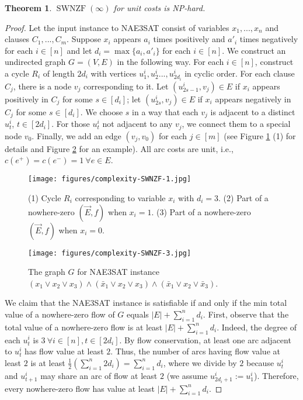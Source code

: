 \documentclass[11pt]{article}
\newtheorem{theorem}{Theorem}
\begin{document}
\begin{theorem}\label{thm:complexity-SWNZF}
    $\operatorname{SWNZF}(\infty)$ for unit costs is NP-hard.
\end{theorem}
\begin{proof}
    Let the input instance to NAE3SAT consist of variables $x_1,...,x_n$ and clauses $C_1,...,C_m$. Suppose $x_i$ appears $a_i$ times positively and $a'_i$ times negatively for each $i\in [n]$ and let $d_i=\max\{a_i,a'_i\}$ for each $i\in [n]$. We construct an undirected graph $G=(V,E)$ in the following way. For each $i\in [n]$, construct a cycle $R_i$ of length $2d_i$ with vertices $u_1^i,u_2^i...,u_{2d_i}^i$ in cyclic order. For each clause $C_j$, there is a node $v_j$ corresponding to it. Let $(u^i_{2s-1},v_j)\in E$ if $x_i$ appears positively in $C_j$ for some $s\in [d_i]$; let $(u^i_{2s},v_j)\in E$ if $x_i$ appears negatively in $C_j$ for some $s\in [d_i]$. We choose $s$ in a way that each $v_j$ is adjacent to a distinct $u^i_t$, $t\in [2d_i]$. For those $u^i_t$ not adjacent to any $v_j$, we connect them to a special node $v_0$. Finally, we add an edge $(v_j,v_0)$ for each $j\in [m]$ (see Figure \ref{fig:complexity-SWNZF-1} (1) for details and Figure \ref{fig:complexity-SWNZF-3} for an example). All arc costs are unit, i.e., $c(e^+)=c(e^-)=1\ \forall e\in E$.
    \begin{figure}[htbp]
        \centering
        \texttt{[image: figures/complexity-SWNZF-1.jpg]}
        \caption{(1) Cycle $R_i$ corresponding to variable $x_i$ with $d_i=3$. (2) Part of a nowhere-zero $(\vec{E},f)$ when $x_i=1$. (3) Part of a nowhere-zero $(\vec{E},f)$ when $x_i=0$.}
        \label{fig:complexity-SWNZF-1}
    \end{figure}

        \begin{figure}[htbp]
    \centering
\texttt{[image: figures/complexity-SWNZF-3.jpg]}
        \caption{The graph $G$ for NAE3SAT instance $(x_1\vee x_2\vee x_3)\wedge (\bar{x}_1\vee x_2\vee x_3)\wedge (\bar{x}_1\vee x_2\vee \bar{x}_3)$.}
        \label{fig:complexity-SWNZF-3}
    \end{figure}
    We claim that the NAE3SAT instance is satisfiable if and only if the min total value of a nowhere-zero flow of $G$ equals $|E|+\sum_{i=1}^n d_i$. First, observe that the total value of a nowhere-zero flow is at least $|E|+\sum_{i=1}^n d_i$. Indeed, the degree of each $u^i_t$ is $3\ \forall i\in[n], t\in[2d_i]$. By flow conservation, at least one arc adjacent to $u^i_t$ has flow value at least $2$. Thus, the number of arcs having flow value at least $2$ is at least $\frac{1}{2}(\sum_{i=1}^n 2d_i)=\sum_{i=1}^n d_i$, where we divide by $2$ because $u_t^i$ and $u_{t+1}^i$ may share an arc of flow at least $2$ (we assume $u^i_{2d_i+1}:=u^i_1$). Therefore, every nowhere-zero flow has value at least $|E|+\sum_{i=1}^n d_i$.


\end{proof}
\end{document}
